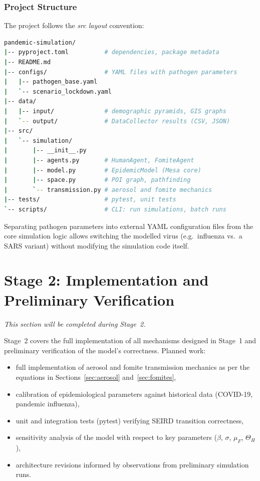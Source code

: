 \documentclass[english]{projectreport}
\begin{document}
\subsubsection{Project Structure}
\label{sec:project-structure}

The project follows the \emph{src layout} convention:

\begin{lstlisting}[language=bash, caption={Planned project directory structure},
  label=lst:structure]
pandemic-simulation/
|-- pyproject.toml          # dependencies, package metadata
|-- README.md
|-- configs/                # YAML files with pathogen parameters
|   |-- pathogen_base.yaml
|   `-- scenario_lockdown.yaml
|-- data/
|   |-- input/              # demographic pyramids, GIS graphs
|   `-- output/             # DataCollector results (CSV, JSON)
|-- src/
|   `-- simulation/
|       |-- __init__.py
|       |-- agents.py       # HumanAgent, FomiteAgent
|       |-- model.py        # EpidemicModel (Mesa core)
|       |-- space.py        # POI graph, pathfinding
|       `-- transmission.py # aerosol and fomite mechanics
|-- tests/                  # pytest, unit tests
`-- scripts/                # CLI: run simulations, batch runs
\end{lstlisting}

Separating pathogen parameters into external YAML configuration files from the
core simulation logic allows switching the modelled virus (e.g.\ influenza
vs.\ a SARS variant) without modifying the simulation code itself.

\section{Stage 2: Implementation and Preliminary Verification}
\label{sec:stage2}

\emph{This section will be completed during Stage~2.}

Stage~2 covers the full implementation of all mechanisms designed in Stage~1
and preliminary verification of the model's correctness. Planned work:

\begin{itemize}
  \item full implementation of aerosol and fomite transmission mechanics as
        per the equations in Sections~\ref{sec:aerosol} and~\ref{sec:fomites},
  \item calibration of epidemiological parameters against historical data
        (COVID-19, pandemic influenza),
  \item unit and integration tests (pytest) verifying SEIRD transition
        correctness,
  \item sensitivity analysis of the model with respect to key parameters
        ($\beta$, $\sigma$, $\mu_F$, $\Theta_H$),
  \item architecture revisions informed by observations from preliminary
        simulation runs.
\end{itemize}
\end{document}
